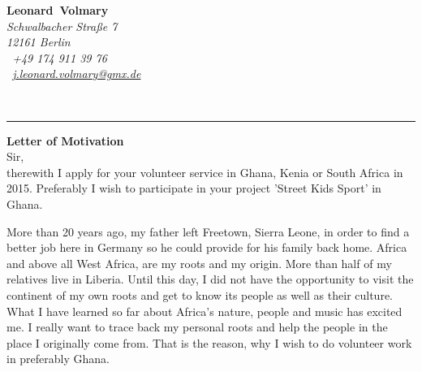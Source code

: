 \documentclass[11pt,a4paper]{article}
\def\firstname{Leonard}
\def\familyname{Volmary}
\begin{document}
\sffamily   %
\hfill%
\begin{minipage}[t]{.6\textwidth}
	\raggedleft%
	{\bfseries {\color{firstnamecolor}\firstname}~{\color{familynamecolor}\familyname}}\\[.35ex]
	\small\itshape%
	Schwalbacher Straße 7\\
	12161 Berlin\\[.35ex]
	\Mobilefone~+49 174 911 39 76\\
	\Letter~\href{mailto:j.leonard.volmary@gmx.de}{j.leonard.volmary@gmx.de}
\end{minipage}\\ %
%
{\color{firstnamecolor}\rule{\textwidth}{.25ex}}
%
% 
\hfill
%

{\bfseries \color{familynamecolor}Letter of Motivation}\\[0.5em]

Sir,\\ %
%
therewith I apply for your volunteer service in Ghana, Kenia or South Africa in 2015. Preferably I wish to participate in your project 'Street Kids Sport' in Ghana.

More than 20 years ago, my father left Freetown, Sierra Leone, in order to find a better job here in Germany so he could provide for his family back home. Africa and above all West Africa, are my roots and my origin. More than half of my relatives live in Liberia. Until this day, I did not have the opportunity to visit the continent of my own roots and get to know its people as well as their culture. What I have learned so far about Africa's nature, people and music has excited me. I really want to trace back my personal roots and help the people in the place I originally come from. That is the reason, why I wish to do volunteer work in preferably Ghana.
\end{document}
